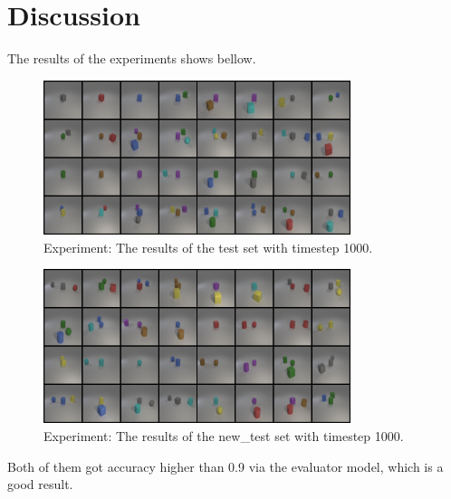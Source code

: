 \section{Discussion}

The results of the experiments shows bellow.

\begin{figure}[H]
    \centering
    \includegraphics[width=0.8\textwidth]{figures/test_1000.png}
    \caption{Experiment: The results of the test set with timestep 1000.}
    \label{fig:exp_test_1000}
\end{figure}

\begin{figure}[H]
    \centering
    \includegraphics[width=0.8\textwidth]{figures/new_test_1000.png}
    \caption{Experiment: The results of the new\_test set with timestep 1000.}
    \label{fig:exp_new_test_1000}
\end{figure}

Both of them got accuracy higher than 0.9 via the evaluator model, which is a good result.
